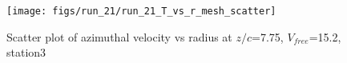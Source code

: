 \begin{figure}[H]
\centering
\texttt{[image: figs/run\_21/run\_21\_T\_vs\_r\_mesh\_scatter]}
\caption{Scatter plot of azimuthal velocity vs radius at $z/c$=7.75, $V_{free}$=15.2, station3}
\label{fig:run_21_T_vs_r_mesh_scatter}
\end{figure}



